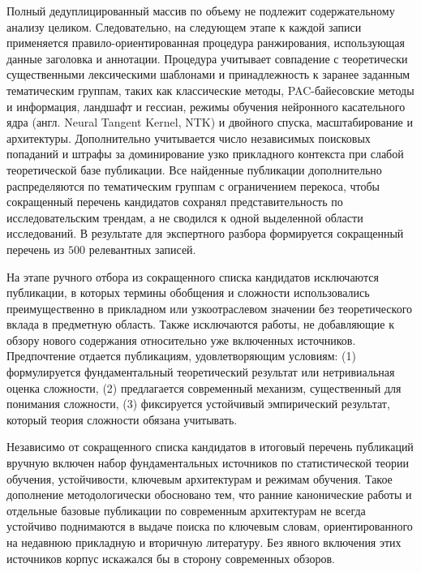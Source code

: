 Полный дедуплицированный массив по объему не подлежит содержательному анализу целиком.
Следовательно, на следующем этапе к каждой записи применяется правило-ориентированная процедура ранжирования, использующая данные заголовка и аннотации.
Процедура учитывает совпадение с теоретически существенными лексическими шаблонами и принадлежность к заранее заданным тематическим группам, таких как классические методы, PAC-байесовские методы и информация, ландшафт и гессиан, режимы обучения нейронного касательного ядра (англ. Neural Tangent Kernel, NTK) и двойного спуска, масштабирование и архитектуры.
Дополнительно учитывается число независимых поисковых попаданий и штрафы за доминирование узко прикладного контекста при слабой теоретической базе публикации.
Все найденные публикации дополнительно распределяются по тематическим группам с ограничением перекоса, чтобы сокращенный перечень кандидатов сохранял представительность по исследовательским трендам, а не сводился к одной выделенной области исследований.
В результате для экспертного разбора формируется сокращенный перечень из $500$ релевантных записей.

На этапе ручного отбора из сокращенного списка кандидатов исключаются публикации, в которых термины обобщения и сложности использовались преимущественно в прикладном или узкоотраслевом значении без теоретического вклада в предметную область.
Также исключаются работы, не добавляющие к обзору нового содержания относительно уже включенных источников.
Предпочтение отдается публикациям, удовлетворяющим условиям: (1) формулируется фундаментальный теоретический результат или нетривиальная оценка сложности, (2) предлагается современный механизм, существенный для понимания сложности, (3) фиксируется устойчивый эмпирический результат, который теория сложности обязана учитывать.

Независимо от сокращенного списка кандидатов в итоговый перечень публикаций вручную включен набор фундаментальных источников по статистической теории обучения, устойчивости, ключевым архитектурам и режимам обучения.
Такое дополнение методологически обосновано тем, что ранние канонические работы и отдельные базовые публикации по современным архитектурам не всегда устойчиво поднимаются в выдаче поиска по ключевым словам, ориентированного на недавнюю прикладную и вторичную литературу.
Без явного включения этих источников корпус искажался бы в сторону современных обзоров.

